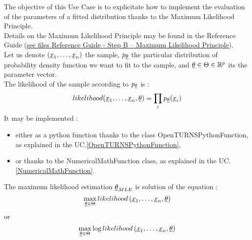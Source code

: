 \renewcommand{\filename}{docUC_InputWithData_MaxLikelihood.tex}
\renewcommand{\filetitle}{UC : Maximum likelihood of a given probability density function }

\HeaderIIILevel





The objective of this Use Case is to explicitate how to implement the evaluation of the parameters of a fitted distribution thanks to the Maximum Likelihood Principle.\\


Details on the Maximum Likelihood  Principle may be found in the Reference Guide (\href{OpenTURNS_ReferenceGuide.pdf}{see files Reference Guide - Step B -- Maximum Likelihood  Principle}).\\

Let us denote $({\underline{x}}_1, \dots, {\underline{x}}_n)$ the sample, $p_{{\underline{\theta}}}$ the particular distribution of probability density function we want to fit to the sample, and  ${\underline{\theta}} \in \Theta \in \mathbb{R}^p$ its the parameter vector.\\

The likelihood of the sample according to  $p_{{\underline{\theta}}}$ is :
$$
likelihood({\underline{x}}_1, \dots, {\underline{x}}_n,{\underline{\theta}}) = \prod_i p_{{\underline{\theta}}}({\underline{x}}_i)
$$
It may be implemented :
\begin{itemize}
\item either as a python function thanks to the class OpenTURNSPythonFunction, as explained in the UC.\ref{OpenTURNSPythonFunction},
\item or thanks to the NumericalMathFunction class, as explained in the UC.\ref{NumericalMathFunction}.
\end{itemize}

The maximum likelihood estimation ${\underline{\theta}}_{MLE}$ is solution of the equation :
$$
\max_{{\underline{\theta}} \in \Theta} likelihood\, ({\underline{x}}_1, \dots, {\underline{x}}_n,{\underline{\theta}})
$$
or
$$
\max_{{\underline{\theta}} \in \Theta}  \log likelihood\, ({\underline{x}}_1, \dots, {\underline{x}}_n,{\underline{\theta}})
$$


